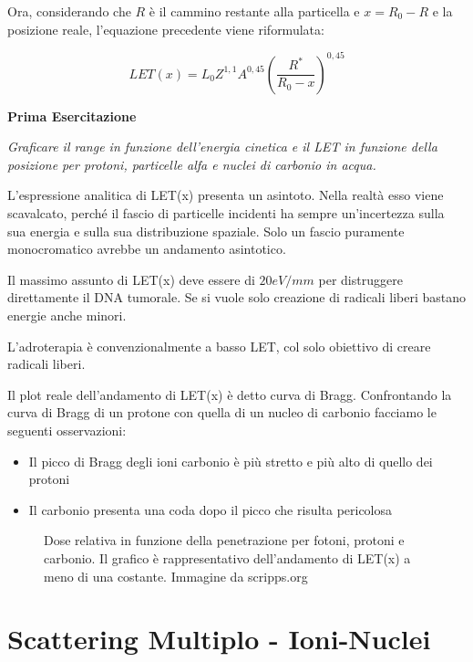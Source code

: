 Ora, considerando che $R$ è il cammino restante alla particella e $x=R_0-R$ e la posizione reale, l'equazione precedente viene riformulata:

\begin{equation}
LET(x)=L_0Z^{1,1}A^{0,45}(\frac{R^*}{R_0-x})^{0,45}
\end{equation}

\textbf{Prima Esercitazione}

\emph{Graficare il range in funzione dell'energia cinetica e il LET in funzione della posizione per protoni, particelle alfa e nuclei di carbonio in acqua.}

L'espressione analitica di LET(x) presenta un asintoto. Nella realtà esso viene scavalcato, perché il fascio di particelle incidenti ha sempre un'incertezza sulla sua energia e sulla sua distribuzione spaziale. Solo un fascio puramente monocromatico avrebbe un andamento asintotico. 

Il massimo assunto di LET(x) deve essere di $20 eV/mm$ per distruggere direttamente il DNA tumorale. Se si vuole solo creazione di radicali liberi bastano energie anche minori.

L'adroterapia è convenzionalmente a basso LET, col solo obiettivo di creare radicali liberi. 

Il plot reale dell'andamento di LET(x) è detto curva di Bragg. Confrontando la curva di Bragg di un protone con quella di un nucleo di carbonio facciamo le seguenti osservazioni:

\begin{itemize}
\item Il picco di Bragg degli ioni carbonio è più stretto e più alto di quello dei protoni
\item Il carbonio presenta una coda dopo il picco che risulta pericolosa
\end{itemize}

\begin{figure}
\centering
	\caption{Dose relativa in funzione della penetrazione per fotoni, protoni e carbonio. Il grafico è rappresentativo dell'andamento di LET(x) a meno di una costante. Immagine da scripps.org}
	\label{fig:bragg}
\end{figure}


\section{Scattering Multiplo - Ioni-Nuclei}

